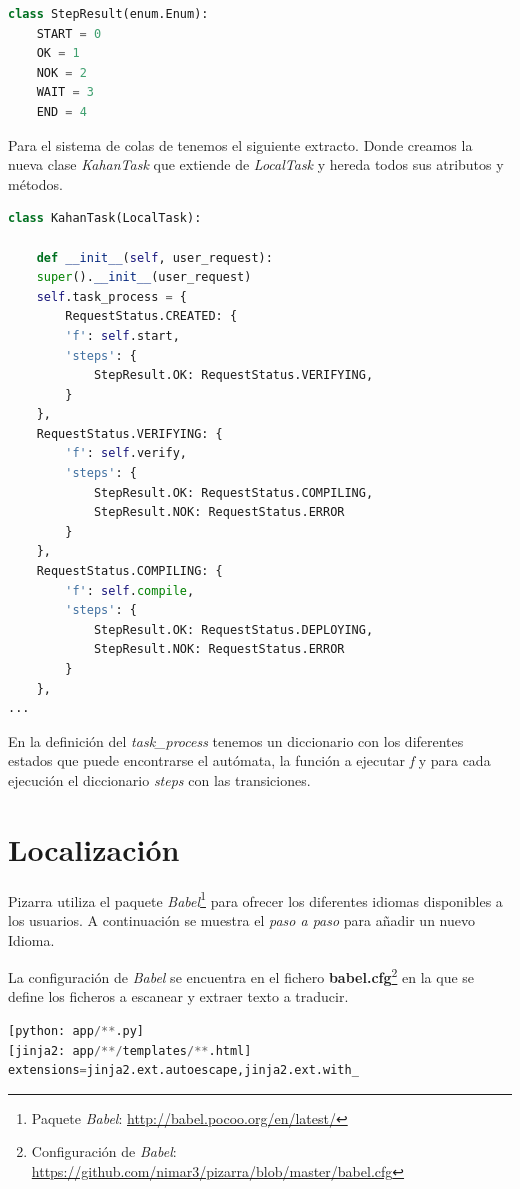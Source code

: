 \documentclass[11pt,spanish,listoffigures,listoftables]{tfgetsinf}
\begin{document}
\begin{lstlisting}[language=python]
class StepResult(enum.Enum):
	START = 0
	OK = 1
	NOK = 2
	WAIT = 3
	END = 4
\end{lstlisting}

Para el sistema de \Gls{cola}s de \kahan tenemos el siguiente extracto. Donde creamos la nueva clase \textit{KahanTask} que extiende de \textit{LocalTask} y hereda todos sus atributos y métodos.

\begin{lstlisting}[language=python]
class KahanTask(LocalTask):

	def __init__(self, user_request):
	super().__init__(user_request)
	self.task_process = {
		RequestStatus.CREATED: {
		'f': self.start,
		'steps': {
			StepResult.OK: RequestStatus.VERIFYING,
		}
	},
	RequestStatus.VERIFYING: {
		'f': self.verify,
		'steps': {
			StepResult.OK: RequestStatus.COMPILING,
			StepResult.NOK: RequestStatus.ERROR
		}
	},
	RequestStatus.COMPILING: {
		'f': self.compile,
		'steps': {
			StepResult.OK: RequestStatus.DEPLOYING,
			StepResult.NOK: RequestStatus.ERROR
		}
	},
...
\end{lstlisting}

En la definición del \textit{task\_process} tenemos un diccionario con los diferentes estados que puede encontrarse el autómata, la función a ejecutar \textit{f} y para cada ejecución el diccionario \textit{steps} con las transiciones.

\section{Localización}

Pizarra utiliza el \Gls{paquete} \textit{Babel}\footnote{Paquete \textit{Babel}: \url{http://babel.pocoo.org/en/latest/}} para ofrecer los diferentes idiomas disponibles a los usuarios. A continuación se muestra el \textit{paso a paso} para añadir un nuevo Idioma.

La configuración de \textit{Babel} se encuentra en el fichero \textbf{babel.cfg}\footnote{Configuración de \textit{Babel}: \url{https://github.com/nimar3/pizarra/blob/master/babel.cfg}} en la que se define los ficheros a escanear y extraer texto a traducir.

\begin{lstlisting}[language=python]
[python: app/**.py]
[jinja2: app/**/templates/**.html]
extensions=jinja2.ext.autoescape,jinja2.ext.with_
\end{lstlisting}
\end{document}

